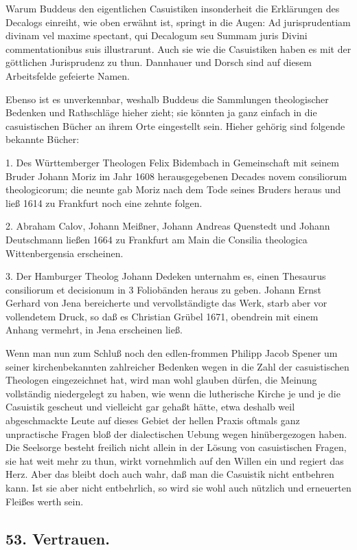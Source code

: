 Warum Buddeus den eigentlichen Casuistiken insonderheit die Erklärungen des Decalogs einreiht, wie oben erwähnt
ist, springt in die Augen: Ad jurisprudentiam divinam vel maxime spectant, qui Decalogum seu Summam juris Divini commentationibus suis illustrarunt. Auch sie wie die Casuistiken haben es mit der göttlichen Jurisprudenz zu thun. Dannhauer und Dorsch sind auf diesem Arbeitsfelde gefeierte Namen.

Ebenso ist es unverkennbar, weshalb Buddeus die Sammlungen theologischer Bedenken und Rathschläge hieher zieht; sie könnten ja ganz einfach in die casuistischen Bücher an ihrem Orte eingestellt sein. Hieher gehörig sind folgende bekannte Bücher:

1. Des Württemberger Theologen Felix Bidembach in Gemeinschaft mit seinem Bruder Johann Moriz im Jahr 1608 herausgegebenen Decades novem consiliorum theologicorum; die neunte gab Moriz nach dem Tode seines Bruders heraus und ließ 1614 zu Frankfurt noch eine zehnte folgen.

2. Abraham Calov, Johann Meißner, Johann Andreas Quenstedt und Johann Deutschmann ließen 1664 zu Frankfurt am Main die Consilia theologica Wittenbergensia erscheinen.

3. Der Hamburger Theolog Johann Dedeken unternahm es, einen Thesaurus consiliorum et decisionum in 3 Foliobänden heraus zu geben. Johann Ernst Gerhard von Jena bereicherte und vervollständigte das Werk, starb aber vor vollendetem Druck, so daß es Christian Grübel 1671, obendrein mit einem Anhang vermehrt, in Jena erscheinen ließ.

Wenn man nun zum Schluß noch den edlen-frommen Philipp Jacob Spener um seiner kirchenbekannten
zahlreicher Bedenken wegen in die Zahl der casuistischen Theologen eingezeichnet hat, wird man wohl glauben dürfen, die Meinung vollständig niedergelegt zu haben, wie wenn die lutherische Kirche je und je die Casuistik gescheut und vielleicht gar gehaßt hätte, etwa deshalb weil abgeschmackte Leute auf dieses Gebiet der hellen Praxis oftmals ganz unpractische Fragen bloß der dialectischen Uebung wegen hinübergezogen haben. Die Seelsorge besteht freilich nicht allein in der Lösung von casuistischen Fragen, sie hat weit mehr zu thun, wirkt vornehmlich auf den Willen ein und regiert das Herz. Aber das bleibt doch auch wahr, daß man die Casuistik nicht entbehren kann. Ist sie aber nicht entbehrlich, so wird sie wohl auch nützlich und erneuerten Fleißes werth sein.

\subsection*{53. Vertrauen.}


